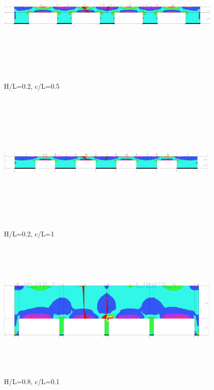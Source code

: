 \documentclass[11pt, a4paper]{article}
\begin{document}
\begin{figure}[H]
	\includegraphics[width=\textwidth, height=7cm]{Slike/H-L_0-2 (0-5).png}
	\caption{H/L=0.2, c/L=0.5}
\end{figure}

\begin{figure}[H]
	\includegraphics[width=\textwidth, height=7cm]{Slike/H-L_0-2 (1-0).png}
	\caption{H/L=0.2, c/L=1}
\end{figure}
\newpage
\begin{figure}[H]
	\includegraphics[width=\textwidth, height=7cm]{Slike/H-L_0-8 (0-1).png}
	\caption{H/L=0.8, c/L=0.1}
\end{figure}
\end{document}
